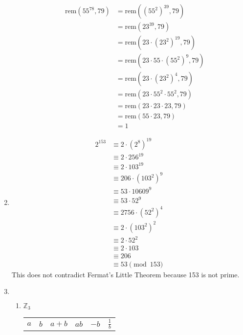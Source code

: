 \documentclass{article}
\newcommand{\rem}[2]{\textrm{rem}(#1, #2)}
\begin{document}
\begin{enumerate}
\begin{enumerate}
\begin{align*}
                        \rem{55^{78}}{79} &= \rem{(55^2)^{39}}{79} \\
                        &= \rem{23^{39}}{79} \\
                        &= \rem{23\cdot (23^2)^{19}}{79} \\
                        &= \rem{23\cdot 55 \cdot (55^2)^9}{79} \\
                        &= \rem{23\cdot (23^2)^4}{79} \\
                        &= \rem{23\cdot 55^2 \cdot 55^2}{79} \\
                        &= \rem{23 \cdot 23 \cdot 23}{79} \\
                        &= \rem {55 \cdot 23}{79} \\
                        &= 1
                    \end{align*}
            \end{enumerate}
        \item \begin{align*}
                2^{153} &\equiv 2 \cdot (2^8)^{19} \\
                &\equiv 2 \cdot 256^{19} \\
                &\equiv 2 \cdot 103^{19} \\
                &\equiv 206 \cdot (103^2)^9 \\
                &\equiv 53 \cdot 10609^9 \\
                &\equiv 53 \cdot 52 ^ 9 \\
                &\equiv 2756 \cdot (52^2)^4 \\
                &\equiv 2 \cdot (103^2)^2 \\
                &\equiv 2 \cdot 52^2 \\
                &\equiv 2 \cdot 103 \\
                &\equiv 206 \\
                &\equiv 53 \pmod{153}
            \end{align*}
            This does not contradict Fermat's Little Theorem because 153 is not prime.
        \item $ $
            \begin{enumerate}
                \item $\mathbb{Z}_3$ \begin{table}[H]
                    \centering
                    \begin{tabular}{|c|c|c|c|c|c|}
                    \hline
                    $a$ & $b$ & $a+b$ & $ab$ & $-b$ & $\frac{1}{b}$ \\

\end{tabular}
\end{table}
\end{enumerate}
\end{enumerate}
\end{document}
